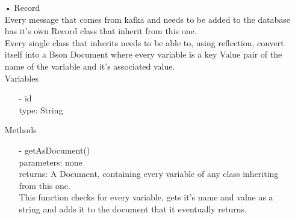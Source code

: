 \documentclass[twoside, english, draft]{design}
\begin{document}
\begin{itemize}
	\item[•]Record
	\\Every message that comes from kafka and needs to be added to the database has it's own Record class that inherit from this one.
	\\Every single class that inherits needs to be able to, using reflection, convert itself into a Bson Document where every variable is a key Value pair of the name of the variable and it's associated value.
	\\Variables
	\begin{itemize}
			\item[-] id
			\\type: String
	\end{itemize}
	Methods
	\begin{itemize}
			\item[-]getAsDocument()
			\\parameters: none
			\\returns: A Document, containing every variable of any class inheriting from this one.
			\\This function checks for every variable, gets it's name and value as a string and adds it to the document that it eventually returns.
	\end{itemize}
	

\end{itemize}
\end{document}

